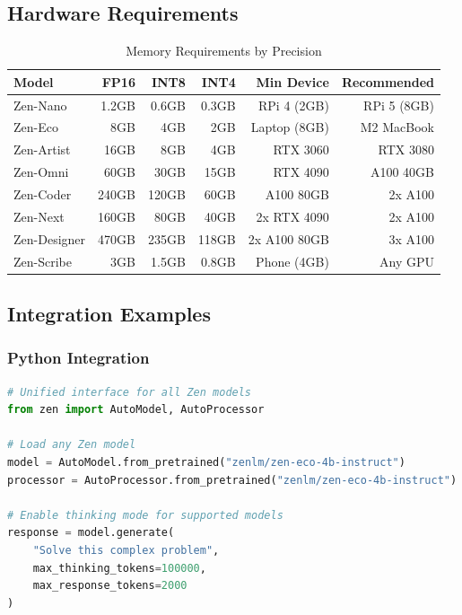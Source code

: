 \documentclass[11pt,a4paper]{article}
\begin{document}
\subsection{Hardware Requirements}

\begin{table}[H]
\centering
\footnotesize
\begin{tabular}{lrrrrr}
\toprule
\textbf{Model} & \textbf{FP16} & \textbf{INT8} & \textbf{INT4} & \textbf{Min Device} & \textbf{Recommended} \\
\midrule
Zen-Nano & 1.2GB & 0.6GB & 0.3GB & RPi 4 (2GB) & RPi 5 (8GB) \\
Zen-Eco & 8GB & 4GB & 2GB & Laptop (8GB) & M2 MacBook \\
Zen-Artist & 16GB & 8GB & 4GB & RTX 3060 & RTX 3080 \\
Zen-Omni & 60GB & 30GB & 15GB & RTX 4090 & A100 40GB \\
Zen-Coder & 240GB & 120GB & 60GB & A100 80GB & 2x A100 \\
Zen-Next & 160GB & 80GB & 40GB & 2x RTX 4090 & 2x A100 \\
Zen-Designer & 470GB & 235GB & 118GB & 2x A100 80GB & 3x A100 \\
Zen-Scribe & 3GB & 1.5GB & 0.8GB & Phone (4GB) & Any GPU \\
\bottomrule
\end{tabular}
\caption{Memory Requirements by Precision}
\end{table}

\subsection{Integration Examples}

\subsubsection{Python Integration}
\begin{lstlisting}[language=Python]
# Unified interface for all Zen models
from zen import AutoModel, AutoProcessor

# Load any Zen model
model = AutoModel.from_pretrained("zenlm/zen-eco-4b-instruct")
processor = AutoProcessor.from_pretrained("zenlm/zen-eco-4b-instruct")

# Enable thinking mode for supported models
response = model.generate(
    "Solve this complex problem",
    max_thinking_tokens=100000,
    max_response_tokens=2000
)
\end{lstlisting}
\end{document}
